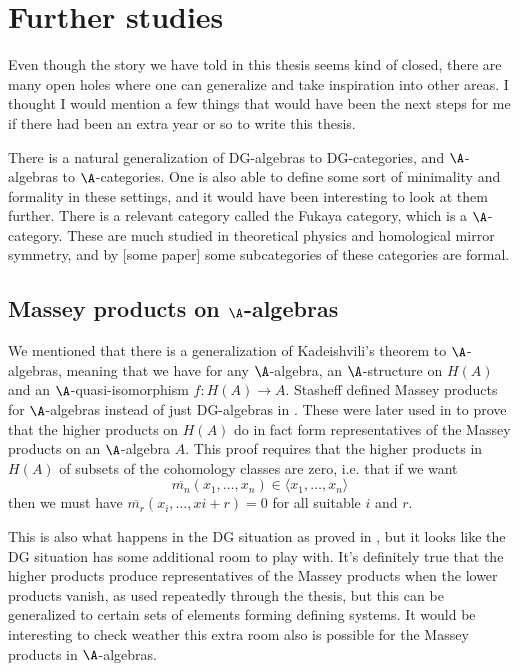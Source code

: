 
\section{Further studies}

Even though the story we have told in this thesis seems kind of closed, there are many open holes where one can generalize and take inspiration into other areas. I thought I would mention a few things that would have been the next steps for me if there had been an extra year or so to write this thesis. 

There is a natural generalization of DG-algebras to DG-categories, and $\A$-algebras to $\A$-categories. One is also able to define some sort of minimality and formality in these settings, and it would have been interesting to look at them further. There is a relevant category called the Fukaya category, which is a $\A$-category. These are much studied in theoretical physics and homological mirror symmetry, and by [some paper] some subcategories of these categories are formal. 



\subsection*{Massey products on $\A$-algebras}

We mentioned that there is a generalization of Kadeishvili's theorem to $\A$-algebras, meaning that we have for any $\A$-algebra, an $\A$-structure on $H(A)$ and an $\A$-quasi-isomorphism $f\colon H(A)\longrightarrow A$. Stasheff defined Massey products for $\A$-algebras instead of just DG-algebras in \cite{h-spaces}. These were later used in \cite{infty-massey} to prove that the higher products on $H(A)$ do in fact form representatives of the Massey products on an $\A$-algebra $A$. This proof requires that the higher products in $H(A)$ of subsets of the cohomology classes are zero, i.e. that if we want 
\begin{equation*}
    \overline{m_n}(x_1, \ldots, x_n)\in \langle x_1, \ldots, x_n\rangle
\end{equation*}
then we must have $\overline{m_r}(x_{i}, \ldots, x{i+r}) = 0$ for all suitable $i$ and $r$. 

This is also what happens in the DG situation as proved in \cite{detection}, but it looks like the DG situation has some additional room to play with. It's definitely true that the higher products produce representatives of the Massey products when the lower products vanish, as used repeatedly through the thesis, but this can be generalized to certain sets of elements forming defining systems. It would be interesting to check weather this extra room also is possible for the Massey products in $\A$-algebras. 
